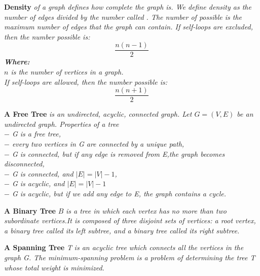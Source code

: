 	\newpage
	\begin{definition} \textbf{Density} \emph{of a graph defines how complete the graph is. We define density as the number of edges divided by the number called . The number of possible is the maximum number of edges that the graph can contain.
	If self-loops are excluded, then the number possible is:\\
	\begin{equation}\label{acyclic_density}
	\frac{n(n-1)}{2}
	\end{equation}
	\textbf{Where:}\\
	$n$ is the number of vertices in a graph.\\
	\newline
	If self-loops are allowed, then the number possible is:
	\begin{equation}\label{cyclic_density}
	\frac{n(n+1)}{2}
	\end{equation}
	}
	\newline
	\end{definition}
\begin{definition}\textbf{A Free Tree} \emph{ is an undirected, acyclic, connected graph. Let $G = (V,E)$ be an undirected graph. Properties of a tree \cite{Needham}\\
	$-$ \textit{G} is a free tree,\\
	$-$ every two vertices in \textit{G} are connected by a unique path,\\
	$-$ \textit{G} is connected, but if any edge is removed from \textit{E},the graph becomes disconnected,\\
	$-$ \textit{G} is connected, and $|E| = |V| - 1$,\\
	$-$ \textit{G} is acyclic, and $|E| = |V| - 1$\\
	$-$ \textit{G} is acyclic, but if we add any edge to \textit{E}, the graph contains a cycle.\\
}
\end{definition}
\begin{definition}\textbf{A Binary Tree} $B$ \emph{is a tree in which each vertex has no more than two subordinate vertices.It is composed of three disjoint sets of vertices: a root vertex, a binary tree called its left subtree, and a binary tree called its right subtree.\cite{La Rocca}}\end{definition}
\begin{definition}\textbf{A Spanning Tree }\textit{T} \emph{is an acyclic tree which connects all the vertices in the graph \textit{G}. The minimum-spanning problem is a problem of determining the tree \textit{T} whose total weight is minimized.\cite{Jarai}}\end{definition}
